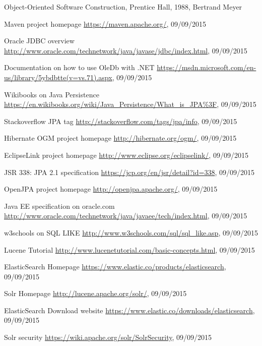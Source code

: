 \begin{thebibliography}{100}
	 Object-Oriented Software Construction, Prentice Hall, 1988, Bertrand Meyer
	
	 Maven project homepage
	\url{https://maven.apache.org/}, 09/09/2015
	
	 Oracle JDBC overview
	\url{http://www.oracle.com/technetwork/java/javase/jdbc/index.html}, 09/09/2015
	
	 Documentation on how to use OleDb with .NET
	\url{https://msdn.microsoft.com/en-us/library/5ybdbtte(v=vs.71).aspx}, 09/09/2015
	
	 Wikibooks on Java Persistence
	\url{https://en.wikibooks.org/wiki/Java_Persistence/What_is_JPA\%3F}, 09/09/2015
	
	 Stackoverflow JPA tag
	\url{http://stackoverflow.com/tags/jpa/info}, 09/09/2015
	
	 Hibernate OGM project homepage
	\url{http://hibernate.org/ogm/}, 09/09/2015
	
	 EclipseLink project homepage
	\url{http://www.eclipse.org/eclipselink/}, 09/09/2015
	
	 JSR 338: JPA 2.1 specification
	\url{https://jcp.org/en/jsr/detail?id=338}, 09/09/2015
	
	 OpenJPA project homepage
	\url{http://openjpa.apache.org/}, 09/09/2015
	
	 Java EE specification on oracle.com
	\url{http://www.oracle.com/technetwork/java/javaee/tech/index.html}, 09/09/2015
	
	 w3schools on SQL LIKE
	\url{http://www.w3schools.com/sql/sql_like.asp}, 09/09/2015
	
	 Lucene Tutorial
	\url{http://www.lucenetutorial.com/basic-concepts.html}, 09/09/2015
	
	 ElasticSearch Homepage
	\url{https://www.elastic.co/products/elasticsearch}, 09/09/2015
	
	 Solr Homepage
	\url{http://lucene.apache.org/solr/}, 09/09/2015
	
	 ElasticSearch Download website
	\url{https://www.elastic.co/downloads/elasticsearch}, 09/09/2015
	
	 Solr security
	\url{https://wiki.apache.org/solr/SolrSecurity}, 09/09/2015
	

\end{thebibliography}
